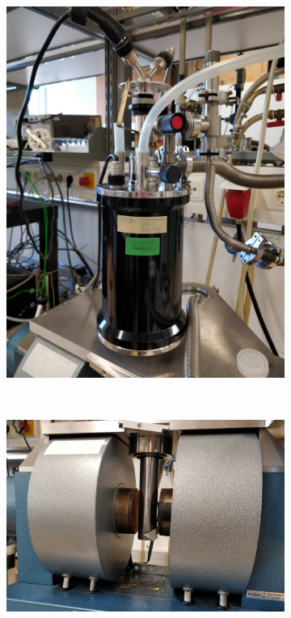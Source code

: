 \documentclass[11pt,a4paper]{article}
\begin{document}
\begin{figure}[H]
\begin{subfigure}[b]{0.4\textwidth}
\includegraphics[width=\textwidth]{cryostat}
\caption{}
\label{fig:cryostat}
\end{subfigure}\\\vspace{.2cm}
\begin{subfigure}[b]{0.5\textwidth}
\includegraphics[width=\textwidth]{electromagnet}

\end{subfigure}
\end{figure}
\end{document}
